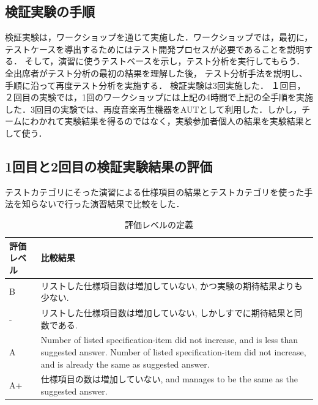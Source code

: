 \documentclass[a4paper,12pt]{jreport}
\begin{document}
\subsection{検証実験の手順}

検証実験は，ワークショップを通じて実施した．ワークショップでは，最初に，テストケースを導出するためにはテスト開発プロセスが必要であることを説明する．
そして，演習に使うテストベースを示し，テスト分析を実行してもらう．
全出席者がテスト分析の最初の結果を理解した後， テスト分析手法を説明し、手順に沿って再度テスト分析を実施する．
検証実験は3回実施した．
１回目，２回目の実験では，1回のワークショップには上記の4時間で上記の全手順を実施した．3回目の実験では、再度音楽再生機器をAUTとして利用した．しかし，チームにわかれて実験結果を得るのではなく，実験参加者個人の結果を実験結果として使う．
\subsection{1回目と2回目の検証実験結果の評価}
テストカテゴリにそった演習による仕様項目の結果とテストカテゴリを使った手法を知らないで行った演習結果で比較をした．
\begin{table}[htbp]
  \centering
  \caption{評価レベルの定義}
    \begin{tabular}{|l|p{14.855em}|}
       \hline
    評価レベル & \multicolumn{1}{l|}{比較結果} \\
        \hline
     B    & リストした仕様項目数は増加していない, かつ実験の期待結果よりも少ない.  \\
        \hline
    -     & リストした仕様項目数は増加していない, しかしすでに期待結果と同数である.  \\
        \hline
    A     & Number of listed specification-item did not increase, and is less than suggested answer. Number of listed specification-item did not increase, and is already the same as suggested answer.  \\
       \hline
    A+    & 仕様項目の数は増加していない, and manages to be the same as the suggested answer.  \\
        \hline
    \end{tabular}%
  \label{tbl:D-3-tbl4}%
\end{table}%
\end{document}
